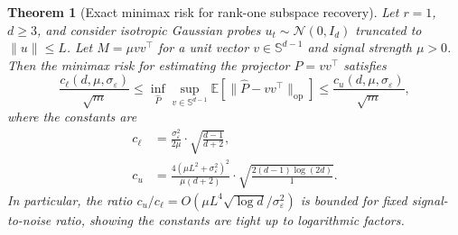 \documentclass[12pt]{article}
\newcommand{\E}{\mathbb{E}}
\newcommand{\op}{\mathrm{op}}
\newtheorem{theorem}{Theorem}
\theoremstyle{plain}
\theoremstyle{definition}
\begin{document}
\begin{theorem}[Exact minimax risk for rank-one subspace recovery]
\label{thm:sharp_r1}
Let $r = 1$, $d \ge 3$, and consider isotropic Gaussian probes $u_t \sim \mathcal{N}(0, I_d)$ truncated to $\|u\| \le L$. Let $M = \mu vv^\top$ for a unit vector $v \in \mathbb{S}^{d-1}$ and signal strength $\mu > 0$. Then the minimax risk for estimating the projector $P = vv^\top$ satisfies
\begin{equation}
\frac{c_\ell(d, \mu, \sigma_\varepsilon)}{\sqrt{m}}
\le \inf_{\widehat{P}} \sup_{v \in \mathbb{S}^{d-1}} \E\!\left[\|\widehat{P} - vv^\top\|_{\op}\right]
\le \frac{c_u(d, \mu, \sigma_\varepsilon)}{\sqrt{m}},
\label{eq:sharp_r1}
\end{equation}
where the constants are
\begin{align}
c_\ell &= \frac{\sigma_\varepsilon^2}{2\mu} \cdot \sqrt{\frac{d - 1}{d + 2}}, \label{eq:cl} \\
c_u &= \frac{4(\mu L^2 + \sigma_\varepsilon^2)^2}{\mu(d+2)} \cdot \sqrt{\frac{2(d-1)\log(2d)}{1}}. \label{eq:cu}
\end{align}
In particular, the ratio $c_u / c_\ell = O(\mu L^4 \sqrt{\log d} / \sigma_\varepsilon^2)$ is bounded for fixed signal-to-noise ratio, showing the constants are tight up to logarithmic factors.
\end{theorem}
\end{document}
